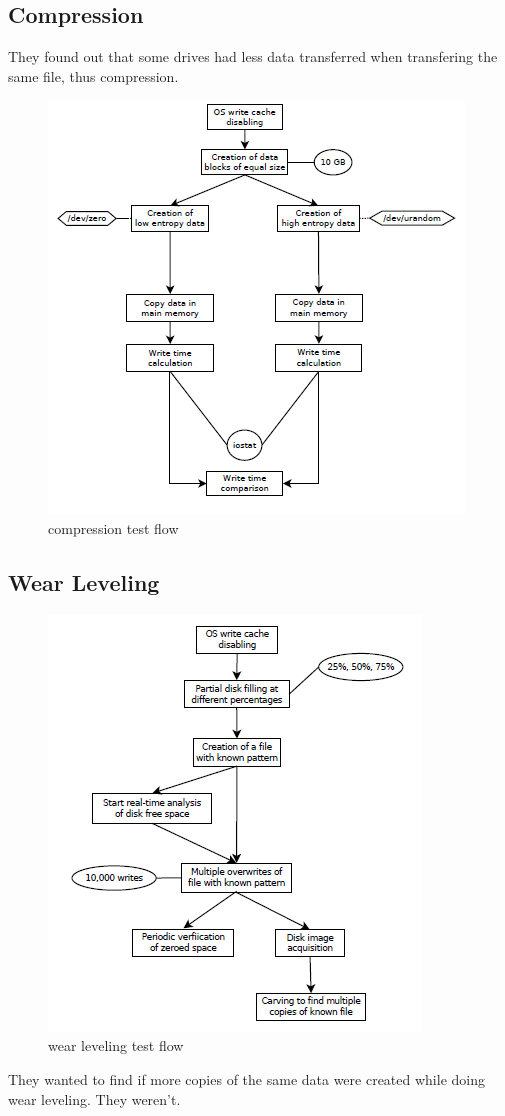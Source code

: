     \subsection{Compression}
        They found out that some drives had less data transferred when transfering the same file, thus compression.
        \begin{figure}[ht!]
            \centering
            \includegraphics[width=0.5\linewidth]{compression.png}
            \caption{compression test flow}
        \end{figure}
    \subsection{Wear Leveling}
        \begin{figure}[ht!]
            \centering
            \includegraphics[width=0.5\linewidth]{wearleveling.png}
            \caption{wear leveling test flow}
        \end{figure}
        They wanted to find if more copies of the same data were created while doing wear leveling. They weren't.
